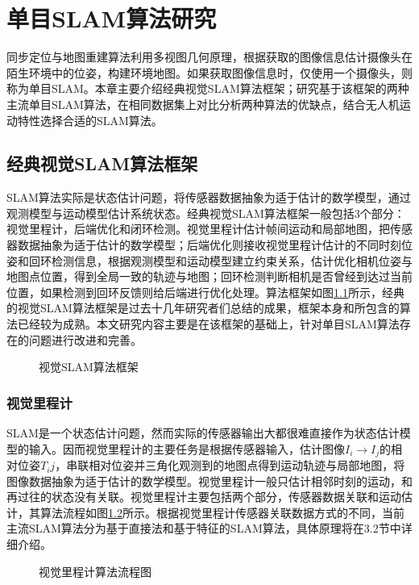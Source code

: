 
\chapter{单目SLAM算法研究}
\label{chap:ALGORITHM}

同步定位与地图重建算法利用多视图几何原理\upcite{[]}，根据获取的图像信息估计摄像头在陌生环境中的位姿，构建环境地图。如果获取图像信息时，仅使用一个摄像头，则称为单目SLAM。本章主要介绍经典视觉SLAM算法框架；研究基于该框架的两种主流单目SLAM算法，在相同数据集上对比分析两种算法的优缺点，结合无人机运动特性选择合适的SLAM算法。

\section{经典视觉SLAM算法框架}
SLAM算法实际是状态估计问题，将传感器数据抽象为适于估计的数学模型，通过观测模型与运动模型估计系统状态。经典视觉SLAM算法框架一般包括3个部分：视觉里程计，后端优化和闭环检测。视觉里程计估计帧间运动和局部地图，把传感器数据抽象为适于估计的数学模型；后端优化则接收视觉里程计估计的不同时刻位姿和回环检测信息，根据观测模型和运动模型建立约束关系，估计优化相机位姿与地图点位置，得到全局一致的轨迹与地图；回环检测判断相机是否曾经到达过当前位置，如果检测到回环反馈则给后端进行优化处理。算法框架如图\ref{fig3.1}所示，经典的视觉SLAM算法框架是过去十几年研究者们总结的成果，框架本身和所包含的算法已经较为成熟。本文研究内容主要是在该框架的基础上，针对单目SLAM算法存在的问题进行改进和完善。
\begin{figure}[h]
\centering
\caption{视觉SLAM算法框架}
\label{fig3.1}
\end{figure}
\subsection{视觉里程计}
SLAM是一个状态估计问题，然而实际的传感器输出大都很难直接作为状态估计模型的输入。因而视觉里程计的主要任务是根据传感器输入，估计图像$I_i \rightarrow I_j$的相对位姿$T_ij$，串联相对位姿并三角化观测到的地图点得到运动轨迹与局部地图，将图像数据抽象为适于估计的数学模型。视觉里程计一般只估计相邻时刻的运动，和再过往的状态没有关联。视觉里程计主要包括两个部分，传感器数据关联和运动估计，其算法流程如图\ref{fig3.2}所示。根据视觉里程计传感器关联数据方式的不同，当前主流SLAM算法分为基于直接法和基于特征的SLAM算法，具体原理将在3.2节中详细介绍。
\begin{figure}[h]
\centering
\caption{视觉里程计算法流程图}
\label{fig3.2}
\end{figure}

